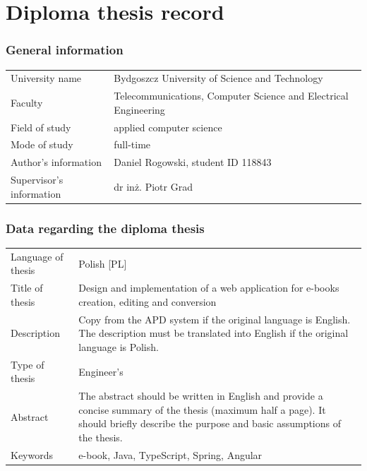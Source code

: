 \newpage
\section*{Diploma thesis record}
\subsubsection*{General information}
\begin{tabular}{p{3cm}p{12cm}}
University name & Bydgoszcz University of Science and Technology\\
Faculty &  Telecommunications, Computer  Science  
and Electrical Engineering\\
Field of study & applied computer science \\
Mode of study & full-time \\
Author's information & Daniel Rogowski, student ID 118843 \\
Supervisor's information & dr inż. Piotr Grad \\
\end{tabular}

\subsubsection*{Data regarding the diploma thesis}
\begin{tabular}{p{3cm}p{12cm}}
Language of thesis & Polish [PL] \\
Title of thesis & Design and implementation of a web application for e-books creation, editing and conversion \\
Description  & Copy from the APD system if the original language is English. The description must be translated into English if the original language is Polish.\\
Type of thesis & Engineer’s \\
Abstract & The abstract should be written in English and provide a concise summary of the thesis (maximum half a page). It should briefly describe the purpose and basic assumptions of the thesis. \\
Keywords & e-book, Java, TypeScript, Spring, Angular \\
\end{tabular}


